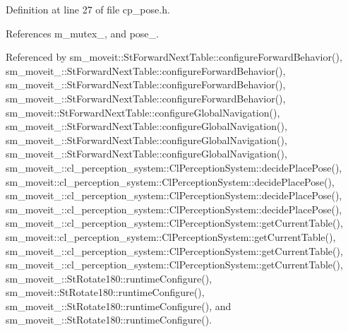Definition at line 27 of file cp\+\_\+pose.\+h.



References m\+\_\+mutex\+\_\+, and pose\+\_\+.



Referenced by sm\+\_\+moveit\+::\+St\+Forward\+Next\+Table\+::configure\+Forward\+Behavior(), sm\+\_\+moveit\+\_\+::\+St\+Forward\+Next\+Table\+::configure\+Forward\+Behavior(), sm\+\_\+moveit\+\_\+::\+St\+Forward\+Next\+Table\+::configure\+Forward\+Behavior(), sm\+\_\+moveit\+\_\+::\+St\+Forward\+Next\+Table\+::configure\+Forward\+Behavior(), sm\+\_\+moveit\+::\+St\+Forward\+Next\+Table\+::configure\+Global\+Navigation(), sm\+\_\+moveit\+\_\+::\+St\+Forward\+Next\+Table\+::configure\+Global\+Navigation(), sm\+\_\+moveit\+\_\+::\+St\+Forward\+Next\+Table\+::configure\+Global\+Navigation(), sm\+\_\+moveit\+\_\+::\+St\+Forward\+Next\+Table\+::configure\+Global\+Navigation(), sm\+\_\+moveit\+\_\+::cl\+\_\+perception\+\_\+system\+::\+Cl\+Perception\+System\+::decide\+Place\+Pose(), sm\+\_\+moveit\+::cl\+\_\+perception\+\_\+system\+::\+Cl\+Perception\+System\+::decide\+Place\+Pose(), sm\+\_\+moveit\+\_\+::cl\+\_\+perception\+\_\+system\+::\+Cl\+Perception\+System\+::decide\+Place\+Pose(), sm\+\_\+moveit\+\_\+::cl\+\_\+perception\+\_\+system\+::\+Cl\+Perception\+System\+::decide\+Place\+Pose(), sm\+\_\+moveit\+\_\+::cl\+\_\+perception\+\_\+system\+::\+Cl\+Perception\+System\+::get\+Current\+Table(), sm\+\_\+moveit\+::cl\+\_\+perception\+\_\+system\+::\+Cl\+Perception\+System\+::get\+Current\+Table(), sm\+\_\+moveit\+\_\+::cl\+\_\+perception\+\_\+system\+::\+Cl\+Perception\+System\+::get\+Current\+Table(), sm\+\_\+moveit\+\_\+::cl\+\_\+perception\+\_\+system\+::\+Cl\+Perception\+System\+::get\+Current\+Table(), sm\+\_\+moveit\+\_\+::\+St\+Rotate180\+::runtime\+Configure(), sm\+\_\+moveit\+::\+St\+Rotate180\+::runtime\+Configure(), sm\+\_\+moveit\+\_\+::\+St\+Rotate180\+::runtime\+Configure(), and sm\+\_\+moveit\+\_\+::\+St\+Rotate180\+::runtime\+Configure().


